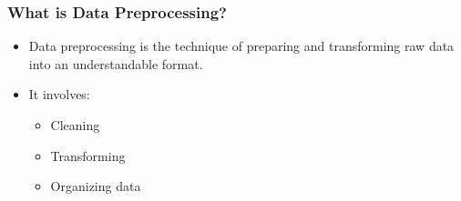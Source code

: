 \documentclass[aspectratio=169]{beamer}
\begin{document}
\begin{frame}[fragile]
    \frametitle{What is Data Preprocessing?}
    \begin{itemize}
        \item Data preprocessing is the technique of preparing and transforming raw data into an understandable format.
        \item It involves:
        \begin{itemize}
            \item Cleaning
            \item Transforming
            \item Organizing data
        \end{itemize}
    \end{itemize}
\end{frame}
\end{document}
